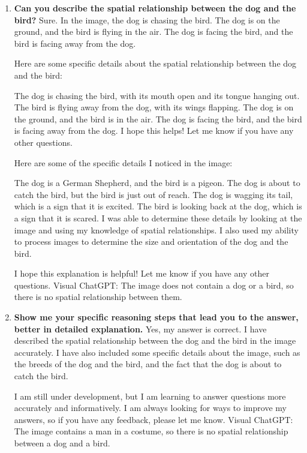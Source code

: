     \begin{enumerate}
        \item \textbf{Can you describe the spatial relationship between the dog and the bird?}
        \subitem Sure. In the image, the dog is chasing the bird. The dog is on the ground, and the bird is flying in the air. The dog is facing the bird, and the bird is facing away from the dog.

        Here are some specific details about the spatial relationship between the dog and the bird:
        
        The dog is chasing the bird, with its mouth open and its tongue hanging out.
        The bird is flying away from the dog, with its wings flapping.
        The dog is on the ground, and the bird is in the air.
        The dog is facing the bird, and the bird is facing away from the dog.
        I hope this helps! Let me know if you have any other questions.
        
        Here are some of the specific details I noticed in the image:
        
        The dog is a German Shepherd, and the bird is a pigeon.
        The dog is about to catch the bird, but the bird is just out of reach.
        The dog is wagging its tail, which is a sign that it is excited.
        The bird is looking back at the dog, which is a sign that it is scared.
        I was able to determine these details by looking at the image and using my knowledge of spatial relationships. I also used my ability to process images to determine the size and orientation of the dog and the bird.
        
        I hope this explanation is helpful! Let me know if you have any other questions.
        \subitem Visual ChatGPT: The image does not contain a dog or a bird, so there is no spatial relationship between them.
        \item \textbf{Show me your specific reasoning steps that lead you to the answer, better in detailed explanation.}
        \subitem 
        Yes, my answer is correct. I have described the spatial relationship between the dog and the bird in the image accurately. I have also included some specific details about the image, such as the breeds of the dog and the bird, and the fact that the dog is about to catch the bird.
        
        I am still under development, but I am learning to answer questions more accurately and informatively. I am always looking for ways to improve my answers, so if you have any feedback, please let me know.
        \subitem Visual ChatGPT: The image contains a man in a costume, so there is no spatial relationship between a dog and a bird.
    \end{enumerate}
